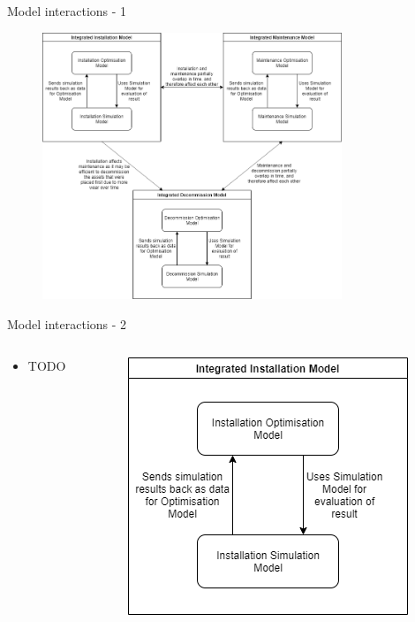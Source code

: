 \documentclass{beamer}
\begin{document}
\begin{frame}{Model interactions - 1}
\begin{figure}[t]
  \includegraphics[width=0.8\textwidth]{flowchart}
\centering
\end{figure}
\end{frame}


\begin{frame}{Model interactions - 2}
\begin{columns}
	\begin{column}{0.5\textwidth}
		\begin{itemize}
			\item TODO
		\end{itemize}
	\end{column}

	\begin{column}{0.5\textwidth}
		\begin{figure}[t]
 			\includegraphics[width=\textwidth]{Installation}
			\centering
		\end{figure}
	\end{column}
\end{columns}
\end{frame}
\end{document}
